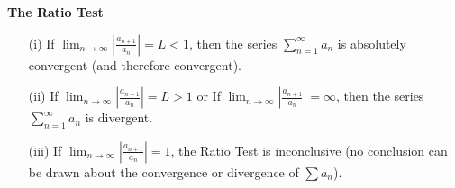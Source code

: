   \begin{minipage}{\linewidth}
    \begin{definition}
      \textbf{The Ratio Test}\\
      \begin{enumerate}
        \item[(i)] If $\displaystyle \lim_{n\to\infty} \left|\frac{a_{n+1}}{a_n}\right| = L < 1$, then the series $\displaystyle \sum_{n=1}^{\infty}  a_n$ is absolutely convergent (and therefore convergent).
        \item[(ii)] If $\displaystyle \lim_{n\to\infty} \left|\frac{a_{n+1}}{a_n}\right| = L > 1$ or If $\displaystyle \lim_{n\to\infty} \left|\frac{a_{n+1}}{a_n}\right| = \infty$, then the series $\displaystyle \sum_{n=1}^{\infty}  a_n$ is divergent.
        \item[(iii)] If $\displaystyle \lim_{n\to\infty} \left|\frac{a_{n+1}}{a_n}\right| = 1$, the Ratio Test is inconclusive (no conclusion can be drawn about the convergence or divergence of $\sum a_n$).
      \end{enumerate}
    \end{definition}
  \end{minipage}
